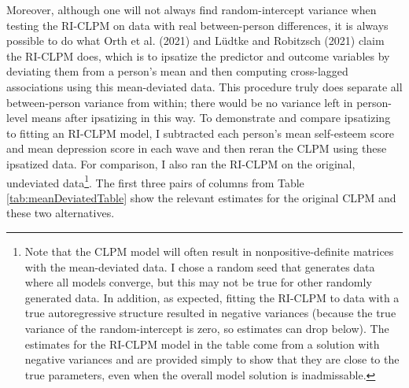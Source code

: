 \documentclass[
  english,
  man,floatsintext]{apa6}
\begin{document}
Moreover, although one will not always find random-intercept variance when testing the RI-CLPM on data with real between-person differences, it is always possible to do what Orth et al. (2021) and Lüdtke and Robitzsch (2021) claim the RI-CLPM does, which is to ipsatize the predictor and outcome variables by deviating them from a person's mean and then computing cross-lagged associations using this mean-deviated data. This procedure truly does separate all between-person variance from within; there would be no variance left in person-level means after ipsatizing in this way. To demonstrate and compare ipsatizing to fitting an RI-CLPM model, I subtracted each person's mean self-esteem score and mean depression score in each wave and then reran the CLPM using these ipsatized data. For comparison, I also ran the RI-CLPM on the original, undeviated data\footnote{Note that the CLPM model will often result in nonpositive-definite matrices with the mean-deviated data. I chose a random seed that generates data where all models converge, but this may not be true for other randomly generated data. In addition, as expected, fitting the RI-CLPM to data with a true autoregressive structure resulted in negative variances (because the true variance of the random-intercept is zero, so estimates can drop below). The estimates for the RI-CLPM model in the table come from a solution with negative variances and are provided simply to show that they are close to the true parameters, even when the overall model solution is inadmissable.}. The first three pairs of columns from Table \ref{tab:meanDeviatedTable} show the relevant estimates for the original CLPM and these two alternatives.
\end{document}
